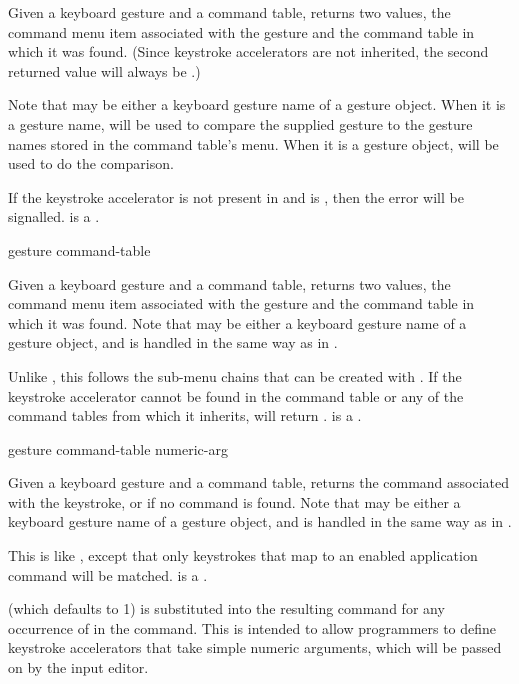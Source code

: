 Given a keyboard gesture  and a command table, returns two values,
the command menu item associated with the gesture and the command table in which
it was found.  (Since keystroke accelerators are not inherited, the second
returned value will always be .)

\ReadOnly

Note that  may be either a keyboard gesture name of a gesture
object.  When it is a gesture name,  will be used to compare the
supplied gesture to the gesture names stored in the command table's menu.  When
it is a gesture object,  will be used to do the
comparison.

If the keystroke accelerator is not present in  and
 is , then the  error will be
signalled.   is a .

 {gesture command-table}

Given a keyboard gesture  and a command table, returns two values,
the command menu item associated with the gesture and the command table in which
it was found.  Note that  may be either a keyboard gesture name of
a gesture object, and is handled in the same way as in .
\ReadOnly

Unlike , this follows the sub-menu chains that can be
created with .  If the keystroke accelerator
cannot be found in the command table or any of the command tables from which it
inherits,  will return .  
is a .

 {gesture command-table \key numeric-arg}

Given a keyboard gesture  and a command table, returns the command
associated with the keystroke, or  if no command is found.  Note
that  may be either a keyboard gesture name of a gesture object,
and is handled in the same way as in .
\ReadOnly

This is like , except that only keystrokes that map to
an enabled application command will be matched.   is a
.

 (which defaults to 1) is substituted into the resulting
command for any occurrence of  in the command.
This is intended to allow programmers to define keystroke accelerators that take
simple numeric arguments, which will be passed on by the input editor.

